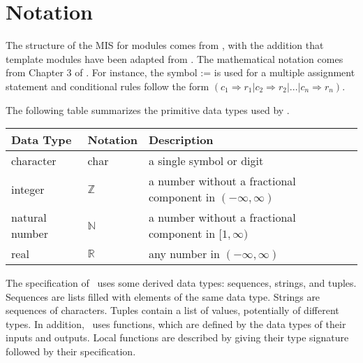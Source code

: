 \documentclass[12pt, titlepage]{article}
\begin{document}


\section{Notation}
The structure of the MIS for modules comes from \citet{HoffmanAndStrooper1995},
with the addition that template modules have been adapted from
\cite{GhezziEtAl2003}.  The mathematical notation comes from Chapter 3 of
\citet{HoffmanAndStrooper1995}.  For instance, the symbol := is used for a
multiple assignment statement and conditional rules follow the form $(c_1
\Rightarrow r_1 | c_2 \Rightarrow r_2 | ... | c_n \Rightarrow r_n )$.

The following table summarizes the primitive data types used by \progname. 

\begin{center}
  \renewcommand{\arraystretch}{1.2}
  \noindent 
  \begin{tabular}{l l p{7.5cm}} 
  \toprule 
  \textbf{Data Type} & \textbf{Notation} & \textbf{Description}\\ 
  \midrule
  character & char & a single symbol or digit\\
  integer & $\mathbb{Z}$ & a number without a fractional component in $(-\infty, \infty)$ \\[4pt]
  natural number & $\mathbb{N}$ & a number without a fractional component in $[1, \infty)$ \\[4pt]
  real & $\mathbb{R}$ & any number in $(-\infty, \infty)$\\[4pt]

  \bottomrule
  \end{tabular} 
  \end{center}

\noindent
The specification of \progname \ uses some derived data types: sequences, strings, and
tuples. Sequences are lists filled with elements of the same data type. Strings
are sequences of characters. Tuples contain a list of values, potentially of
different types. In addition, \progname \ uses functions, which
are defined by the data types of their inputs and outputs. Local functions are
described by giving their type signature followed by their specification.
\end{document}
